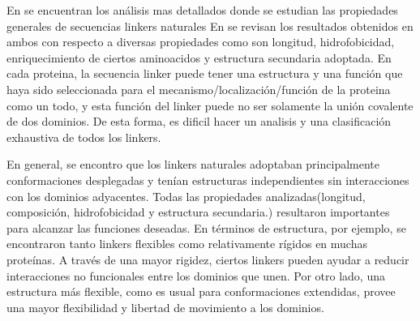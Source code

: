 En \cite{argos1990investigation,george2002analysis} se encuentran los análisis mas detallados donde se estudian las propiedades generales de secuencias linkers naturales
En \cite{chen2013fusion} se revisan los resultados obtenidos en ambos con respecto a diversas propiedades como son longitud, hidrofobicidad, enriquecimiento de ciertos aminoacidos y estructura secundaria adoptada.
En cada proteina, la secuencia linker puede tener una estructura y una función que haya sido seleccionada para el mecanismo/localización/función de la proteina como un todo, 
y esta función del linker puede no ser solamente la unión covalente de dos dominios. 
De esta forma, es dificil hacer un analisis y una clasificación exhaustiva de todos los linkers.

En general, se encontro que los linkers naturales adoptaban principalmente conformaciones desplegadas y tenían estructuras independientes sin interacciones con los dominios adyacentes.
Todas las propiedades analizadas(longitud, composición, hidrofobicidad y estructura secundaria.) resultaron importantes para alcanzar las funciones deseadas.
En términos de estructura, por ejemplo, se encontraron tanto linkers flexibles como relativamente rígidos en muchas proteínas.
A través de una mayor rigidez, ciertos linkers pueden ayudar a reducir interacciones no funcionales entre los dominios que unen. 
Por otro lado, una estructura más flexible, como es usual para conformaciones extendidas, provee una mayor flexibilidad y libertad de movimiento a los dominios.



